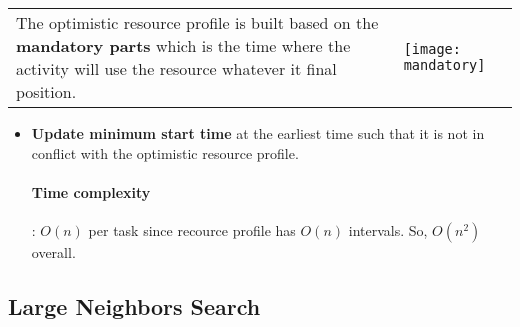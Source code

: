 \begin{tabular}{m{11cm}m{6cm}}
The optimistic resource profile is built based on the
\textbf{mandatory parts} which is the time where the activity will
use the resource whatever it final position.
&
\texttt{[image: mandatory]}
\end{tabular}

\begin{itemize}
    \item \textbf{Update minimum start time} at the earliest
        time such that it is not in conflict with the optimistic
        resource profile.

        \paragraph{Time complexity}: $O(n)$ per task since recource
        profile has $O(n)$ intervals. So, $O(n^2)$ overall.
\end{itemize}


\subsection{Large Neighbors Search}



